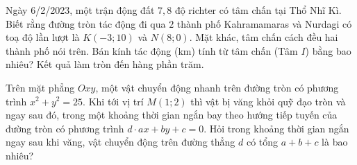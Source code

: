 \begin{bt}%

		Ngày 6/2/2023, một trận động đất $7{,}8$ độ richter có tâm chấn tại Thổ Nhĩ Kì. Biết rằng đường tròn tác động đi qua $2$ thành phố Kahramamaras và Nurdagi có toạ độ lần lượt là $K(-3 ; 10)$ và $N(8 ; 0)$. Mặt khác, tâm chấn cách đều hai thành phố nói trên. Bán kính tác động (km) tính từ tâm chấn (Tâm $I$) bằng bao nhiêu? Kết quả làm tròn đến hàng phần trăm.
\end{bt}

\begin{bt}%
Trên mặt phẳng $Oxy$, một vật chuyển động nhanh trên đường tròn có phương trình $x^2+y^2=25$. Khi tới vị trí $M(1;2)$ thì vật bị văng khỏi quỹ đạo tròn và ngay sau đó, trong một khoảng thời gian ngắn bay theo hướng tiếp tuyến của đường tròn có phương trình $d\cdot ax+by+c=0$. Hỏi trong khoảng thời gian ngắn ngay sau khi văng, vật chuyển động trên đường thẳng $d$ có tổng $a+b+c$ là bao nhiêu?
\end{bt}

